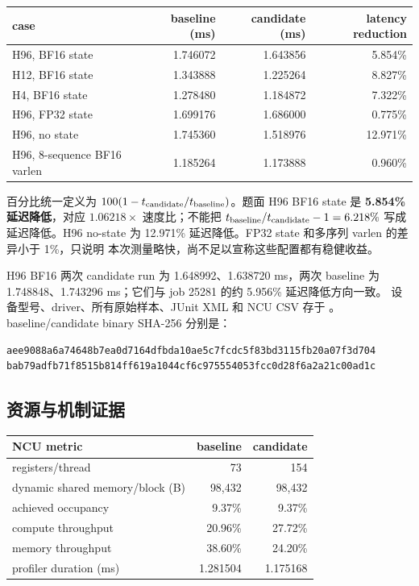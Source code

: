 \begin{center}\small
\begin{tabular}{@{}lrrr@{}}
\toprule
case & baseline (ms) & candidate (ms) & latency reduction \\
\midrule
H96, BF16 state & 1.746072 & 1.643856 & 5.854\% \\
H12, BF16 state & 1.343888 & 1.225264 & 8.827\% \\
H4, BF16 state & 1.278480 & 1.184872 & 7.322\% \\
H96, FP32 state & 1.699176 & 1.686000 & 0.775\% \\
H96, no state & 1.745360 & 1.518976 & 12.971\% \\
H96, 8-sequence BF16 varlen & 1.185264 & 1.173888 & 0.960\% \\
\bottomrule
\end{tabular}
\end{center}

百分比统一定义为 \(100(1-t_{\rm candidate}/t_{\rm baseline})\)。题面 H96 BF16
state 是 \textbf{5.854\% 延迟降低}，对应 \(1.06218\times\) 速度比；不能把
\(t_{\rm baseline}/t_{\rm candidate}-1=6.218\%\) 写成延迟降低。H96 no-state
为 12.971\% 延迟降低。FP32 state 和多序列 varlen 的差异小于 1\%，只说明
本次测量略快，尚不足以宣称这些配置都有稳健收益。

H96 BF16 两次 candidate run 为 1.648992、1.638720 ms，两次 baseline 为
1.748848、1.743296 ms；它们与 job 25281 的约 5.956\% 延迟降低方向一致。
设备型号、driver、所有原始样本、JUnit XML 和 NCU CSV 存于
。baseline/candidate binary SHA-256 分别是：
\begin{lstlisting}
aee9088a6a74648b7ea0d7164dfbda10ae5c7fcdc5f83bd3115fb20a07f3d704
bab79adfb71f8515b814ff619a1044cf6c975554053fcc0d28f6a2a21c00ad1c
\end{lstlisting}

\subsection{资源与机制证据}

\begin{center}\small
\begin{tabular}{@{}lrr@{}}
\toprule
NCU metric & baseline & candidate \\
\midrule
registers/thread & 73 & 154 \\
dynamic shared memory/block (B) & 98,432 & 98,432 \\
achieved occupancy & 9.37\% & 9.37\% \\
compute throughput & 20.96\% & 27.72\% \\
memory throughput & 38.60\% & 24.20\% \\
profiler duration (ms) & 1.281504 & 1.175168 \\
\bottomrule
\end{tabular}
\end{center}

